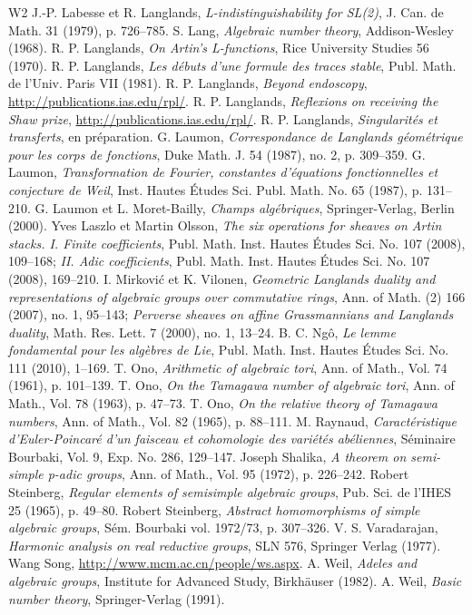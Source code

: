 \begin{thebibliography}{W2}
 J.-P. Labesse et R. Langlands, \textit{L-indistinguishability for SL(2)}, J. Can. de Math. 31 (1979), p. 726--785.
 S. Lang, \textit{Algebraic number theory}, Addison-Wesley (1968).
 R. P. Langlands, \textit{On Artin's L-functions}, Rice University Studies 56 (1970).
 R. P. Langlands, \textit{Les débuts d'une formule des traces stable}, Publ. Math. de l'Univ. Paris VII (1981).
 R. P. Langlands, \textit{Beyond endoscopy}, \url{http://publications.ias.edu/rpl/}.
 R. P. Langlands, \textit{Reflexions on receiving the Shaw prize}, \url{http://publications.ias.edu/rpl/}.
 R. P. Langlands, \textit{Singularités et transferts}, en préparation.
 G. Laumon, \textit{Correspondance de Langlands géométrique pour les corps de fonctions}, Duke Math. J. 54 (1987), no. 2, p. 309--359.
 G. Laumon, \textit{Transformation de Fourier, constantes d'équations fonctionnelles et conjecture de Weil}, Inst. Hautes Études Sci. Publ. Math. No. 65 (1987), p. 131--210.
 G. Laumon et L. Moret-Bailly, \textit{Champs algébriques}, Springer-Verlag, Berlin (2000).
 Yves Laszlo et Martin Olsson, \textit{The six operations for sheaves on Artin stacks. I. Finite coefficients}, Publ. Math. Inst. Hautes Études Sci. No. 107 (2008), 109--168; \textit{II. Adic coefficients}, Publ. Math. Inst. Hautes Études Sci. No. 107 (2008), 169--210.
 I. Mirković et K. Vilonen, \textit{Geometric Langlands duality and representations of algebraic groups over commutative rings}, Ann. of Math. (2) 166 (2007), no. 1, 95--143; \textit{Perverse sheaves on affine Grassmannians and Langlands duality}, Math. Res. Lett. 7 (2000), no. 1, 13--24.
 B. C. Ngô, \textit{Le lemme fondamental pour les algèbres de Lie}, Publ. Math. Inst. Hautes Études Sci. No. 111 (2010), 1--169.
 T. Ono, \textit{Arithmetic of algebraic tori}, Ann. of Math., Vol. 74 (1961), p. 101--139.
 T. Ono, \textit{On the Tamagawa number of algebraic tori}, Ann. of Math., Vol. 78 (1963), p. 47--73.
 T. Ono, \textit{On the relative theory of Tamagawa numbers}, Ann. of Math., Vol. 82 (1965), p. 88--111.
 M. Raynaud, \textit{Caractéristique d'Euler-Poincaré d'un faisceau et cohomologie des variétés abéliennes}, Séminaire Bourbaki, Vol. 9, Exp. No. 286, 129--147.
 Joseph Shalika, \textit{A theorem on semi-simple p-adic groups}, Ann. of Math., Vol. 95 (1972), p. 226--242.
 Robert Steinberg, \textit{Regular elements of semisimple algebraic groups}, Pub. Sci. de l'IHES 25 (1965), p. 49--80.
 Robert Steinberg, \textit{Abstract homomorphisms of simple algebraic groups}, Sém. Bourbaki vol. 1972/73, p. 307--326.
 V. S. Varadarajan, \textit{Harmonic analysis on real reductive groups}, SLN 576, Springer Verlag (1977).
 Wang Song, \url{http://www.mcm.ac.cn/people/ws.aspx}.
 A. Weil, \textit{Adeles and algebraic groups}, Institute for Advanced Study, Birkhäuser (1982).
 A. Weil, \textit{Basic number theory}, Springer-Verlag (1991).
\end{thebibliography}
